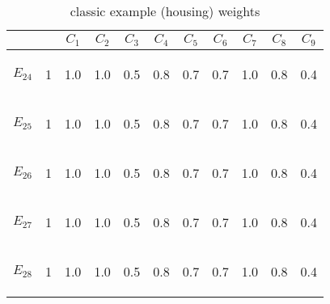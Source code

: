 \begin{table}[htp]
\begin{center}
\begin{tabular}{|cc|c|c|c|c|c|c|c|c|c|}
\hline \hline
& & $C_1$ & $C_2$ & $C_3$ & $C_4$ & $C_5$ & $C_6$ & $C_7$ & $C_8$ & $C_9$\\
\hline \hline
\begin{scriptsize}$E_{24}$\end{scriptsize} & \begin{scriptsize}1\end{scriptsize} & 1.0 & 1.0 & 0.5 & 0.8 & 0.7 & 0.7 & 1.0 & 0.8 & 0.4\\
\begin{scriptsize}$E_{25}$\end{scriptsize} & \begin{scriptsize}1\end{scriptsize} & 1.0 & 1.0 & 0.5 & 0.8 & 0.7 & 0.7 & 1.0 & 0.8 & 0.4\\
\begin{scriptsize}$E_{26}$\end{scriptsize} & \begin{scriptsize}1\end{scriptsize} & 1.0 & 1.0 & 0.5 & 0.8 & 0.7 & 0.7 & 1.0 & 0.8 & 0.4\\
\begin{scriptsize}$E_{27}$\end{scriptsize} & \begin{scriptsize}1\end{scriptsize} & 1.0 & 1.0 & 0.5 & 0.8 & 0.7 & 0.7 & 1.0 & 0.8 & 0.4\\
\begin{scriptsize}$E_{28}$\end{scriptsize} & \begin{scriptsize}1\end{scriptsize} & 1.0 & 1.0 & 0.5 & 0.8 & 0.7 & 0.7 & 1.0 & 0.8 & 0.4\\
\hline \hline
\end{tabular}
\end{center}
\caption{classic example (housing) weights}
\label{classic}
\end{table}